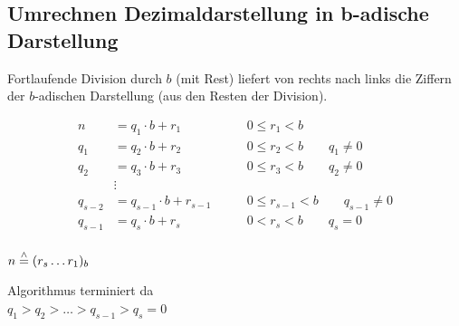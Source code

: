 \clearpage
\subsection{Umrechnen Dezimaldarstellung in b-adische Darstellung}
Fortlaufende Division durch $b$ (mit Rest) liefert von rechts nach links die Ziffern der $b$-adischen Darstellung (aus den Resten der Division).

\begin{align*}
n &= q_1\cdot b + r_1\qquad& 0\le r_1<b\\
q_1 &= q_2\cdot b + r_2\qquad& 0\le r_2<b\qquad q_1 \ne 0\\
q_2 &= q_3\cdot b + r_3\qquad& 0\le r_3<b\qquad q_2 \ne 0\\
&\vdots\\
q_{s-2} &= q_{s-1}\cdot b + r_{s-1}\qquad& 0\le r_{s-1}<b\qquad q_{s-1} \ne 0\\
q_{s-1} &= q_s\cdot b + r_s\qquad& 0< r_s<b\qquad q_s = 0\\
\end{align*}

$n\stackrel{\wedge}{=} (r_s\ldots r_1)_b$

Algorithmus terminiert da\\
$q_1>q_2>\ldots>q_{s-1}>q_s=0$


